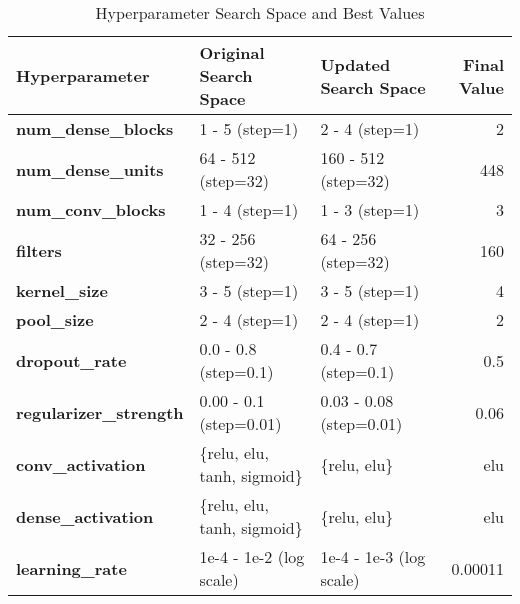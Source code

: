 \documentclass{article}
\begin{document}
\begin{table}[ht]
    \caption{Hyperparameter Search Space and Best Values}
    \vspace{0.2cm}
    \label{tab:hyperparameters}
    \centering
    \begin{adjustbox}{max width=\textwidth}
    \begin{tabular}{l|l|l|r}
        \toprule
        \textbf{Hyperparameter} & \textbf{Original Search Space} & \textbf{Updated Search Space} & \textbf{Final Value} \\
        \midrule
        \textbf{num\_dense\_blocks} & 1 - 5 (step=1) & 2 - 4 (step=1) & 2 \\
        \textbf{num\_dense\_units} & 64 - 512 (step=32) & 160 - 512 (step=32) & 448 \\
        \textbf{num\_conv\_blocks} & 1 - 4 (step=1) & 1 - 3 (step=1) & 3 \\
        \textbf{filters} & 32 - 256 (step=32) & 64 - 256 (step=32) & 160 \\
        \textbf{kernel\_size} & 3 - 5 (step=1) & 3 - 5 (step=1) & 4 \\
        \textbf{pool\_size} & 2 - 4 (step=1) & 2 - 4 (step=1) & 2 \\
        \textbf{dropout\_rate} & 0.0 - 0.8 (step=0.1) & 0.4 - 0.7 (step=0.1) & 0.5 \\
        \textbf{regularizer\_strength} & 0.00 - 0.1 (step=0.01) & 0.03 - 0.08 (step=0.01) & 0.06 \\
        \textbf{conv\_activation} & \{relu, elu, tanh, sigmoid\} & \{relu, elu\} & elu \\
        \textbf{dense\_activation} & \{relu, elu, tanh, sigmoid\} & \{relu, elu\} & elu \\
        \textbf{learning\_rate} & 1e-4 - 1e-2 (log scale) & 1e-4 - 1e-3 (log scale) & 0.00011 \\
        \bottomrule
    \end{tabular}
    \end{adjustbox}
\end{table}
\end{document}
